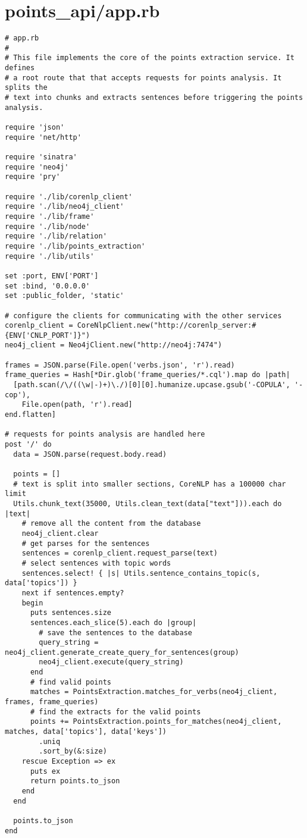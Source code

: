 \documentclass{article}
\begin{document}
\section*{points\_api/app.rb}
\begin{verbatim}
# app.rb
#
# This file implements the core of the points extraction service. It defines
# a root route that that accepts requests for points analysis. It splits the
# text into chunks and extracts sentences before triggering the points analysis.

require 'json'
require 'net/http'

require 'sinatra'
require 'neo4j'
require 'pry'

require './lib/corenlp_client'
require './lib/neo4j_client'
require './lib/frame'
require './lib/node'
require './lib/relation'
require './lib/points_extraction'
require './lib/utils'

set :port, ENV['PORT']
set :bind, '0.0.0.0'
set :public_folder, 'static'

# configure the clients for communicating with the other services
corenlp_client = CoreNlpClient.new("http://corenlp_server:#{ENV['CNLP_PORT']}")
neo4j_client = Neo4jClient.new("http://neo4j:7474")

frames = JSON.parse(File.open('verbs.json', 'r').read)
frame_queries = Hash[*Dir.glob('frame_queries/*.cql').map do |path|
  [path.scan(/\/((\w|-)+)\./)[0][0].humanize.upcase.gsub('-COPULA', '-cop'),
    File.open(path, 'r').read]
end.flatten]

# requests for points analysis are handled here
post '/' do
  data = JSON.parse(request.body.read)

  points = []
  # text is split into smaller sections, CoreNLP has a 100000 char limit
  Utils.chunk_text(35000, Utils.clean_text(data["text"])).each do |text|
    # remove all the content from the database
    neo4j_client.clear
    # get parses for the sentences
    sentences = corenlp_client.request_parse(text)
    # select sentences with topic words
    sentences.select! { |s| Utils.sentence_contains_topic(s, data['topics']) }
    next if sentences.empty?
    begin
      puts sentences.size
      sentences.each_slice(5).each do |group|
        # save the sentences to the database
        query_string = neo4j_client.generate_create_query_for_sentences(group)
        neo4j_client.execute(query_string)
      end
      # find valid points
      matches = PointsExtraction.matches_for_verbs(neo4j_client, frames, frame_queries)
      # find the extracts for the valid points
      points += PointsExtraction.points_for_matches(neo4j_client, matches, data['topics'], data['keys'])
        .uniq
        .sort_by(&:size)
    rescue Exception => ex
      puts ex
      return points.to_json
    end
  end

  points.to_json
end


\end{verbatim}
\pagebreak
\end{document}
